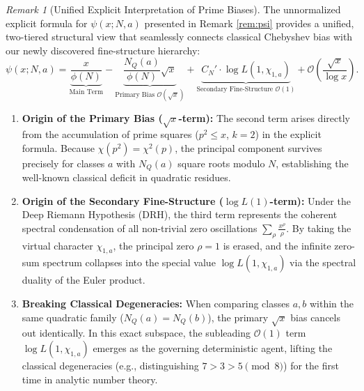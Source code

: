 \documentclass[12pt,reqno]{amsart}
\theoremstyle{definition}
\theoremstyle{remark}
\newtheorem{remark}[theorem]{Remark}
\numberwithin{equation}{section}
\begin{document}
\begin{remark}[Unified Explicit Interpretation of Prime Biases]
\label{rem:unified_explicit}
The unnormalized explicit formula for $\psi(x; N, a)$ presented in Remark \ref{rem:psi} provides a unified, two-tiered structural view that seamlessly connects classical Chebyshev bias with our newly discovered fine-structure hierarchy:
\begin{equation}
\psi(x; N, a) = \underbrace{\frac{x}{\phi(N)}}_{\text{Main Term}} - \underbrace{\frac{N_Q(a)}{\phi(N)} \sqrt{x}}_{\text{Primary Bias }\mathcal{O}(\sqrt{x})} + \underbrace{C_N' \cdot \log L(1, \chi_{1,a})}_{\text{Secondary Fine-Structure }\mathcal{O}(1)} + \mathcal{O}\left( \frac{\sqrt{x}}{\log x} \right).
\end{equation}

\begin{enumerate}
    \item \textbf{Origin of the Primary Bias ($\sqrt{x}$-term):} The second term arises directly from the accumulation of prime squares ($p^2 \le x$, $k=2$) in the explicit formula. Because $\chi(p^2) = \chi^2(p)$, the principal component survives precisely for classes $a$ with $N_Q(a)$ square roots modulo $N$, establishing the well-known classical deficit in quadratic residues.
    
    \item \textbf{Origin of the Secondary Fine-Structure ($\log L(1)$-term):} Under the Deep Riemann Hypothesis (DRH), the third term represents the coherent spectral condensation of all non-trivial zero oscillations $\sum_\rho \frac{x^\rho}{\rho}$. By taking the virtual character $\chi_{1,a}$, the principal zero $\rho=1$ is erased, and the infinite zero-sum spectrum collapses into the special value $\log L(1, \chi_{1,a})$ via the spectral duality of the Euler product.
    
    \item \textbf{Breaking Classical Degeneracies:} When comparing classes $a, b$ within the same quadratic family ($N_Q(a) = N_Q(b)$), the primary $\sqrt{x}$ bias cancels out identically. In this exact subspace, the subleading $\mathcal{O}(1)$ term $\log L(1, \chi_{1,a})$ emerges as the governing deterministic agent, lifting the classical degeneracies (e.g., distinguishing $7 > 3 > 5 \pmod 8$) for the first time in analytic number theory.
\end{enumerate}
\end{remark}
\end{document}
